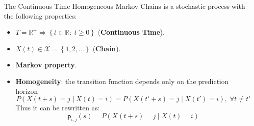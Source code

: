 \documentclass[12pt,a4paper]{article}
\newcommand*{\transp}{\mathsf{p}}
\begin{document}
\bigskip
\noindent
The Continuous Time Homogeneous Markov Chains is a stochastic process with the following properties:
\begin{itemize}
\item $T=\mathbb{R}^+\Rightarrow\left\lbrace t\in\mathbb{R}:\;t\geq 0\right\rbrace $ (\textbf{Continuous Time}).
\item $X(t)\in \mathcal{X}=\left\lbrace 1,2,\dots\right\rbrace$ (\textbf{Chain}).
\item \textbf{Markov property}.
\item \textbf{Homogeneity}: the transition function depends only on the prediction horizon
$$
P\left(X(t+s)=j \mid X(t)=i\right) = P\left(X(t'+s)=j \mid X(t')=i\right),\;\forall t\neq t'
$$
Thus it can be rewritten as:
$$
\transp_{i,j}(s) = P\left(X(t+s)=j \mid X(t)=i\right)
$$
\end{itemize} 
\end{document}
